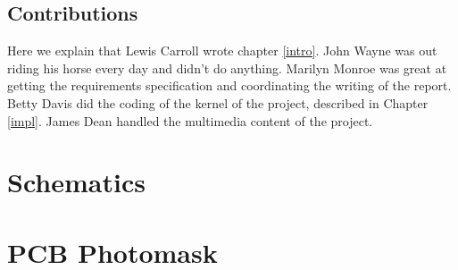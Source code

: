 \documentclass{l3proj}
\begin{document}
\section{Contributions}

Here we explain that Lewis Carroll wrote chapter \ref{intro}. John Wayne
was out riding his horse every day and didn't do anything. Marilyn Monroe
was great at getting the requirements specification and coordinating the
writing of the report. Betty Davis did the coding of the kernel of the
project, described in Chapter \ref{impl}.  James Dean handled the
multimedia content of the project.



\newpage
\appendix
\chapter{Schematics}
\chapter{PCB Photomask}




\end{document}
